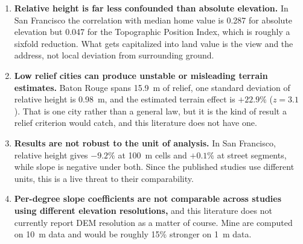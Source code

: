 \documentclass[12pt,letterpaper]{article}
\begin{document}
\begin{enumerate}
\item \textbf{Relative height is far less confounded than absolute elevation.} In San
Francisco the correlation with median home value is 0.287 for absolute elevation but
0.047 for the Topographic Position Index, which is roughly a sixfold reduction. What
gets capitalized into land value is the view and the address, not local deviation from
surrounding ground.

\item \textbf{Low relief cities can produce unstable or misleading terrain
estimates.} Baton Rouge spans 15.9~m of relief, one standard deviation of relative
height is 0.98~m, and the estimated terrain effect is $+22.9\%$ ($z = 3.1$). That is
one city rather than a general law, but it is the kind of result a relief criterion
would catch, and this literature does not have one.

\item \textbf{Results are not robust to the unit of analysis.} In San Francisco,
relative height gives $-9.2\%$ at 100~m cells and $+0.1\%$ at street segments, while
slope is negative under both. Since the published studies use different units, this is
a live threat to their comparability.

\item \textbf{Per-degree slope coefficients are not comparable across studies using
different elevation resolutions,} and this literature does not currently report DEM
resolution as a matter of course. Mine are computed on 10~m data and would be roughly
15\% stronger on 1~m data.


\end{enumerate}
\end{document}
